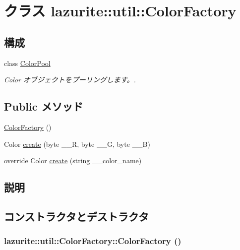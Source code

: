 \hypertarget{classlazurite_1_1util_1_1_color_factory}{
\section{クラス lazurite::util::ColorFactory}
\label{classlazurite_1_1util_1_1_color_factory}
}
\subsection*{構成}
\begin{DoxyCompactItemize}
\item 
class \hyperlink{classlazurite_1_1util_1_1_color_factory_1_1_color_pool}{ColorPool}
\begin{DoxyCompactList}\small\item\em Color オブジェクトをプーリングします。. \item\end{DoxyCompactList}\end{DoxyCompactItemize}
\subsection*{Public メソッド}
\begin{DoxyCompactItemize}
\item 
\hyperlink{classlazurite_1_1util_1_1_color_factory_affc68a91c803ddcedd619756f7ed5296}{ColorFactory} ()
\item 
Color \hyperlink{classlazurite_1_1util_1_1_color_factory_af81bc6312ceffdaad936514513b7718c}{create} (byte \_\-\_\-R, byte \_\-\_\-G, byte \_\-\_\-B)
\item 
override Color \hyperlink{classlazurite_1_1util_1_1_color_factory_a6c8331420df5f3442b357ab5c8f0ec99}{create} (string \_\-\_\-color\_\-name)
\end{DoxyCompactItemize}


\subsection{説明}


\subsection{コンストラクタとデストラクタ}
\hypertarget{classlazurite_1_1util_1_1_color_factory_affc68a91c803ddcedd619756f7ed5296}{
\subsubsection[{ColorFactory}]{\setlength{\rightskip}{0pt plus 5cm}lazurite::util::ColorFactory::ColorFactory ()}}
\label{classlazurite_1_1util_1_1_color_factory_affc68a91c803ddcedd619756f7ed5296}


